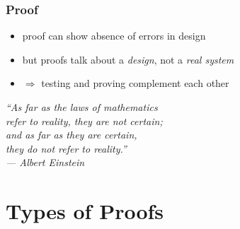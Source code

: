 \begin{frame}
\frametitle{Proof}
\begin{itemize}
\item proof can show absence of errors in design
\item but proofs talk about a \emph{design}, not a \emph{real system}
\item $\Rightarrow$ testing and proving complement each other
\end{itemize}
\bigskip

\begin{raggedleft}
\emph{``As far as the laws of mathematics\\
refer to reality, they are not certain;\\
and as far as they are certain,\\
they do not refer to reality.''\\
--- Albert Einstein\\}
\end{raggedleft}

\end{frame}


\section{Types of Proofs}

